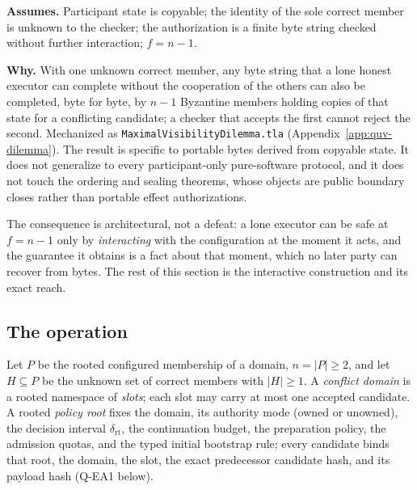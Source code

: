 \documentclass[11pt]{article}
\newcommand{\code}[1]{\texttt{#1}}
\newcommand{\term}[1]{\textit{#1}}
\begin{document}
\noindent\textbf{Assumes.} Participant state is copyable; the identity of the
sole correct member is unknown to the checker; the authorization is a finite
byte string checked without further interaction; \(f = n-1\).

\noindent\textbf{Why.} With one unknown correct member, any byte string that
a lone honest executor can complete without the cooperation of the others can
also be completed, byte for byte, by \(n-1\) Byzantine members holding copies
of that state for a conflicting candidate; a checker that accepts the first
cannot reject the second. Mechanized as \code{MaximalVisibilityDilemma.tla}
(Appendix~\ref{app:quv-dilemma}). The result is specific to portable bytes
derived from copyable state. It does not generalize to every participant-only
pure-software protocol, and it does not touch the ordering and sealing
theorems, whose objects are public boundary closes rather than portable
effect authorizations.

The consequence is architectural, not a defeat: a lone executor can be safe
at \(f = n-1\) only by \emph{interacting} with the configuration at the moment
it acts, and the guarantee it obtains is a fact about that moment, which no
later party can recover from bytes. The rest of this section is the
interactive construction and its exact reach.

\subsection{The operation}
\label{sec:quv-operation}

Let \(P\) be the rooted configured membership of a domain, \(n = |P| \ge 2\),
and let \(H \subseteq P\) be the unknown set of correct members with
\(|H| \ge 1\). A \term{conflict domain} is a rooted namespace of
\term{slots}; each slot may carry at most one accepted candidate. A rooted
\term{policy root} fixes the domain, its authority mode (owned or unowned),
the decision interval \(\delta_{\mathrm{rt}}\), the continuation budget, the
preparation policy, the admission quotas, and the typed initial bootstrap
rule; every candidate binds that root, the domain, the slot, the exact
predecessor candidate hash, and its payload hash (Q-EA1 below).
\end{document}
